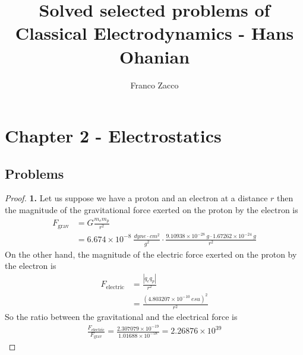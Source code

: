 \documentclass[11pt]{article}
\title{\textbf{Solved selected problems of Classical Electrodynamics - Hans Ohanian}}
\author{Franco Zacco}
\date{}
\theoremstyle{definition}
\begin{document}
\maketitle
\thispagestyle{empty}

\section*{Chapter 2 - Electrostatics}

\subsection*{Problems}
\begin{proof}{\textbf{1.}}
    Let us suppose we have a proton and an electron at a distance $r$
    then the magnitude of the gravitational force exerted on the proton
    by the electron is 
    \begin{align*}
        F_{\text{grav}} &= G\frac{m_em_p}{r^2}\\
        &= 6.674 \times 10^{-8}~\frac{dyne \cdot cm^2}{g^2}
        \cdot\frac{9.10938\times 10^{-28}~g
        \cdot 1.67262 \times 10^{-24}~g}{r^2}
    \end{align*}
    On the other hand, the magnitude of the electric force exerted on the
    proton by the electron is
    \begin{align*}
        F_{\text{electric}} &= \frac{|q_e q_p|}{r^2}\\
        &= \frac{(4.803207\times 10^{-10}~esu)^2}{r^2}
    \end{align*}
    So the ratio between the gravitational and the electrical force is
    \begin{align*}
        \frac{F_{\text{electric}}}{F_{\text{grav}}}
        = \frac{2.307079 \times 10^{-19}}{1.01688\times 10^{-58}}
        = 2.26876 \times 10^{39}
    \end{align*}
\end{proof}
\cleardoublepage
\end{document}

